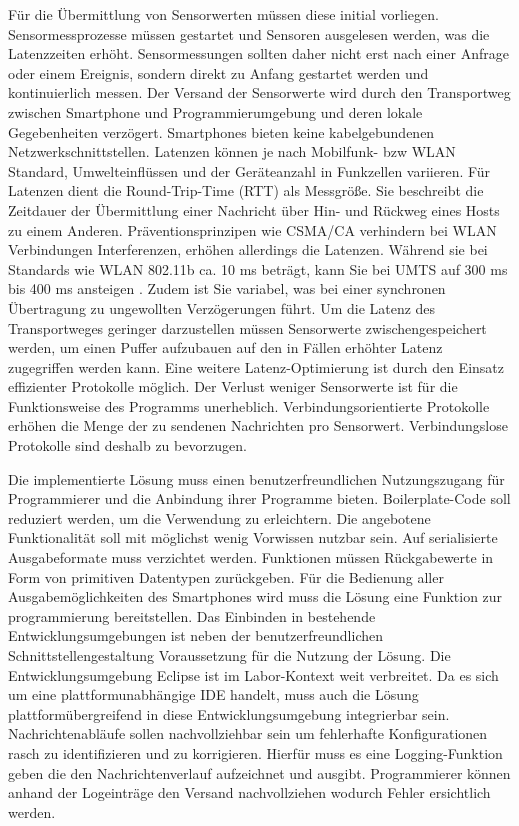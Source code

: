 \documentclass[11pt,a4paper]{report}
\begin{document}
Für die Übermittlung von Sensorwerten müssen diese initial vorliegen.
Sensormessprozesse müssen gestartet und Sensoren ausgelesen werden, was die Latenzzeiten erhöht.
Sensormessungen sollten daher nicht erst nach einer Anfrage oder einem Ereignis, sondern direkt zu Anfang gestartet werden und kontinuierlich messen.
Der Versand der Sensorwerte wird durch den Transportweg zwischen Smartphone und Programmierumgebung und deren lokale Gegebenheiten verzögert.
Smartphones bieten keine kabelgebundenen Netzwerkschnittstellen.
Latenzen können je nach Mobilfunk- bzw WLAN Standard, Umwelteinflüssen und der Geräteanzahl in Funkzellen variieren.
Für Latenzen dient die Round-Trip-Time (RTT) als Messgröße.
Sie beschreibt die Zeitdauer der Übermittlung einer Nachricht über Hin- und Rückweg eines Hosts zu einem Anderen.
Präventionsprinzipen wie CSMA/CA verhindern bei WLAN Verbindungen Interferenzen, erhöhen allerdings die Latenzen.
Während sie bei Standards wie WLAN 802.11b ca. 10 ms beträgt, kann Sie bei UMTS auf 300 ms bis 400 ms ansteigen \cite{network_latencies} .
Zudem ist Sie variabel, was bei einer synchronen Übertragung zu ungewollten Verzögerungen führt.
Um die Latenz des Transportweges geringer darzustellen müssen Sensorwerte zwischengespeichert werden, um einen Puffer aufzubauen auf den in Fällen erhöhter Latenz zugegriffen werden kann.
Eine weitere Latenz-Optimierung ist durch den Einsatz effizienter Protokolle möglich.
Der Verlust weniger Sensorwerte ist für die Funktionsweise des Programms unerheblich.
Verbindungsorientierte Protokolle erhöhen die Menge der zu sendenen Nachrichten pro Sensorwert.
Verbindungslose Protokolle sind deshalb zu bevorzugen.

Die implementierte Lösung muss einen benutzerfreundlichen Nutzungszugang  für Programmierer und die Anbindung ihrer Programme bieten.
Boilerplate-Code soll reduziert werden, um die Verwendung zu erleichtern.
Die angebotene Funktionalität soll mit möglichst wenig Vorwissen nutzbar sein.
Auf serialisierte Ausgabeformate muss verzichtet werden.
Funktionen müssen Rückgabewerte in Form von primitiven Datentypen zurückgeben.
Für die Bedienung aller Ausgabemöglichkeiten des Smartphones wird muss die Lösung eine Funktion zur programmierung bereitstellen.
Das Einbinden in bestehende Entwicklungsumgebungen ist neben der benutzerfreundlichen Schnittstellengestaltung Voraussetzung für die Nutzung der Lösung.
Die Entwicklungsumgebung Eclipse ist im Labor-Kontext weit verbreitet.
Da es sich um eine plattformunabhängige IDE handelt, muss auch die Lösung plattformübergreifend in diese Entwicklungsumgebung integrierbar sein.
Nachrichtenabläufe sollen nachvollziehbar sein um fehlerhafte Konfigurationen rasch zu identifizieren und zu korrigieren.
Hierfür muss es eine Logging-Funktion geben die den Nachrichtenverlauf aufzeichnet und ausgibt.
Programmierer können anhand der Logeinträge den Versand nachvollziehen wodurch Fehler ersichtlich werden.
\end{document}
